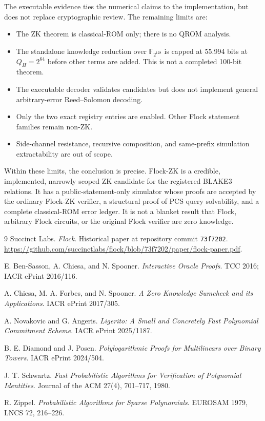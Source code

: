 \documentclass[11pt]{article}
\theoremstyle{definition}
\newcommand{\F}{\mathbb{F}}
\begin{document}
The executable evidence ties the numerical claims to the implementation, but
does not replace cryptographic review.  The remaining limits are:
\begin{itemize}
\item The ZK theorem is classical-ROM only; there is no QROM analysis.
\item The standalone knowledge reduction over $\F_{2^{128}}$ is capped at
55.994 bits at $Q_H=2^{64}$ before other terms are added.  This is not a
completed 100-bit theorem.
\item The executable decoder validates candidates but does not implement
general arbitrary-error Reed--Solomon decoding.
\item Only the two exact registry entries are enabled.  Other Flock statement
families remain non-ZK.
\item Side-channel resistance, recursive composition, and same-prefix
simulation extractability are out of scope.
\end{itemize}

Within these limits, the conclusion is precise.  Flock-ZK is a credible,
implemented, narrowly scoped ZK candidate for the registered BLAKE3 relations.
It has a public-statement-only simulator whose proofs are accepted by the
ordinary Flock-ZK verifier, a structural proof of PCS query solvability, and a
complete classical-ROM error ledger.  It is not a blanket result that Flock,
arbitrary Flock circuits, or the original Flock verifier are zero knowledge.

\begin{thebibliography}{9}
Succinct Labs.
\emph{Flock}.
Historical paper at repository commit \texttt{73f7202}.
\url{https://github.com/succinctlabs/flock/blob/73f7202/paper/flock-paper.pdf}.

E. Ben-Sasson, A. Chiesa, and N. Spooner.
\emph{Interactive Oracle Proofs}.
TCC 2016; IACR ePrint 2016/116.

A. Chiesa, M. A. Forbes, and N. Spooner.
\emph{A Zero Knowledge Sumcheck and its Applications}.
IACR ePrint 2017/305.

A. Novakovic and G. Angeris.
\emph{Ligerito: A Small and Concretely Fast Polynomial Commitment Scheme}.
IACR ePrint 2025/1187.

B. E. Diamond and J. Posen.
\emph{Polylogarithmic Proofs for Multilinears over Binary Towers}.
IACR ePrint 2024/504.

J. T. Schwartz.
\emph{Fast Probabilistic Algorithms for Verification of Polynomial
Identities}.
Journal of the ACM 27(4), 701--717, 1980.

R. Zippel.
\emph{Probabilistic Algorithms for Sparse Polynomials}.
EUROSAM 1979, LNCS 72, 216--226.
\end{thebibliography}
\end{document}
